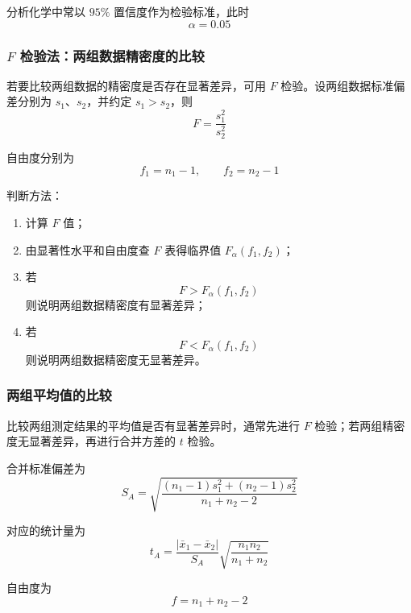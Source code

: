 \documentclass[12pt,a4paper]{article}
\numberwithin{equation}{section}
\begin{document}
分析化学中常以 $95\%$ 置信度作为检验标准，此时
\begin{equation}
\alpha=0.05
\end{equation}

\subsubsection{$F$ 检验法：两组数据精密度的比较}

若要比较两组数据的精密度是否存在显著差异，可用 $F$ 检验。设两组数据标准偏差分别为 $s_1$、$s_2$，并约定 $s_1>s_2$，则
\begin{equation}
F=\frac{s_1^2}{s_2^2}
\end{equation}

自由度分别为
\begin{equation}
f_1=n_1-1,\qquad f_2=n_2-1
\end{equation}

判断方法：
\begin{enumerate}
    \item 计算 $F$ 值；
    \item 由显著性水平和自由度查 $F$ 表得临界值 $F_{\alpha}(f_1,f_2)$；
    \item 若
\begin{equation}
    F>F_{\alpha}(f_1,f_2)
\end{equation}
    则说明两组数据精密度有显著差异；
    \item 若
\begin{equation}
    F<F_{\alpha}(f_1,f_2)
\end{equation}
    则说明两组数据精密度无显著差异。
\end{enumerate}

\subsubsection{两组平均值的比较}

比较两组测定结果的平均值是否有显著差异时，通常先进行 $F$ 检验；若两组精密度无显著差异，再进行合并方差的 $t$ 检验。

合并标准偏差为
\begin{equation}
S_A=
\sqrt{
\frac{(n_1-1)s_1^2+(n_2-1)s_2^2}{n_1+n_2-2}
}
\end{equation}

对应的统计量为
\begin{equation}
t_A=
\frac{|\bar{x}_1-\bar{x}_2|}{S_A}
\sqrt{\frac{n_1n_2}{n_1+n_2}}
\end{equation}

自由度为
\begin{equation}
f=n_1+n_2-2
\end{equation}
\end{document}
